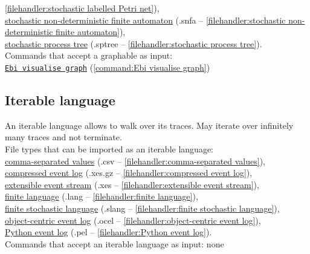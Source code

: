 {\cref{filehandler:stochastic labelled Petri net}), \\\null\qquad\hyperref[filehandler:stochastic non-deterministic finite automaton]{stochastic non-deterministic finite automaton} (.snfa -- \cref{filehandler:stochastic non-deterministic finite automaton}), \\\null\qquad\hyperref[filehandler:stochastic process tree]{stochastic process tree} (.sptree -- \cref{filehandler:stochastic process tree}).
\\Commands that accept a graphable as input: \\\null\qquad\hyperref[command:Ebi visualise graph]{\texttt{Ebi visualise graph}} (\cref{command:Ebi visualise graph})
\subsection{Iterable language}
\label{trait:iterable language}
An iterable language allows to walk over its traces. May iterate over infinitely many traces and not terminate.
\\File types that can be imported as an iterable language: \\\null\qquad\hyperref[filehandler:comma-separated values]{comma-separated values} (.csv -- \cref{filehandler:comma-separated values}), \\\null\qquad\hyperref[filehandler:compressed event log]{compressed event log} (.xes.gz -- \cref{filehandler:compressed event log}), \\\null\qquad\hyperref[filehandler:extensible event stream]{extensible event stream} (.xes -- \cref{filehandler:extensible event stream}), \\\null\qquad\hyperref[filehandler:finite language]{finite language} (.lang -- \cref{filehandler:finite language}), \\\null\qquad\hyperref[filehandler:finite stochastic language]{finite stochastic language} (.slang -- \cref{filehandler:finite stochastic language}), \\\null\qquad\hyperref[filehandler:object-centric event log]{object-centric event log} (.ocel -- \cref{filehandler:object-centric event log}), \\\null\qquad\hyperref[filehandler:Python event log]{Python event log} (.pel -- \cref{filehandler:Python event log}).
\\Commands that accept an iterable language as input: none
}
